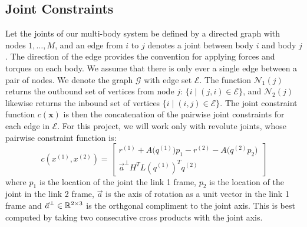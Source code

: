 \documentclass[conference]{IEEEtran}
\begin{document}
\subsection{Joint Constraints}
Let the joints of our multi-body system be defined by a directed graph with nodes $1,\dots,M$,
and an edge from $i$ to $j$ denotes a joint between body $i$ and body $j$. The direction 
of the edge provides the convention for applying forces and torques on each body. We assume 
that there is only ever a single edge between a pair of nodes. We denote the graph 
$\mathcal{G}$ with edge set $\mathcal{E}$. The function $\mathcal{N}_1(j)$ returns the
outbound set of vertices from node $j$: $\{i \mid (j,i) \in \mathcal{E}\}$, 
and $\mathcal{N}_2(j)$ likewise returns the inbound set of vertices 
$\{ i \mid (i,j) \in \mathcal{E}\}$. The joint constraint function $c(\mathbf{x})$ is then 
the concatenation of the pairwise joint constraints for each edge in $\mathcal{E}$. For 
this project, we will work only with revolute joints, whose pairwise constraint function is:
\begin{equation}
    c(x^{(1)}, x^{(2)}) = \begin{bmatrix}
        r^{(1)} + A \big( q^{(1)} \big) p_1 - r^{(2)} - A \big( q^{(2)} p_2 \big) \\
        \vec{a}^\perp H^T L(q^{(1)})^T q^{(2)}
    \end{bmatrix}
\end{equation}
where $p_1$ is the location of the joint the link 1 frame, $p_2$ is the location of the 
joint in the link 2 frame, $\vec{a}$ is the axis of rotation as a unit vector in the 
link 1 frame and $\vec{a}^\perp \in \mathbb{R}^{2 \times 3}$ is the orthgonal compliment to the 
joint axis. This is best computed by taking two consecutive cross products with the joint 
axis. 
\end{document}
